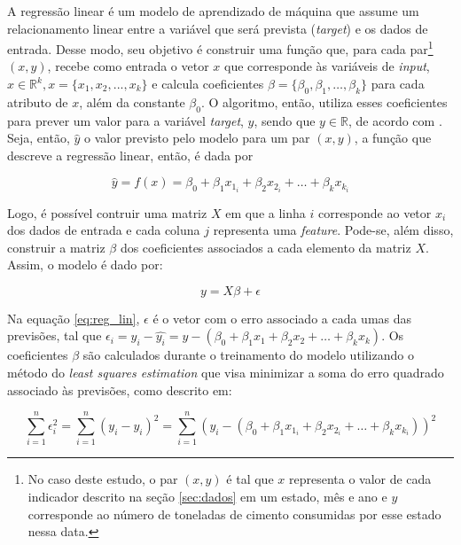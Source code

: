 A regressão linear é um modelo de aprendizado de máquina que assume um relacionamento
linear entre a variável que será prevista (\textit{target}) e os dados de entrada.
Desse modo, seu objetivo é construir uma 
função que, para cada par\footnote{No
caso deste estudo, o par  $(x,y)$ é tal que 
$x$ representa o valor de cada
indicador descrito na seção \ref{sec:dados} em um estado, mês e ano e 
$y$ corresponde ao número de toneladas de cimento consumidas
por esse estado nessa data.} $(x,y)$, recebe como
entrada o vetor $x$ que corresponde às variáveis de \textit{input},
$x \in \mathbb{R}^k , x=\{x_1, x_2, ..., x_k\}$ e calcula coeficientes
$\beta = \{\beta_0, \beta_1, \dots, \beta_k\}$ para cada atributo de $x$,
além da constante $\beta_0$. O algoritmo, então, utiliza esses coeficientes para
prever um valor para a variável \textit{target}, $y$, sendo 
que $y \in \mathbb{R}$, de acordo com \citet{forecasting}. Seja,
então, $\hat{y}$ o valor previsto pelo modelo para um 
par $(x, y)$, a função que descreve a 
regressão linear, então, é dada por

\begin{equation}
  \hat{y} = f(x) = \beta_0 + \beta_1 x_{1_i} + \beta_2 x_{2_i} + \dots + \beta_k x_{k_i} 
\end{equation}

Logo, é possível contruir uma matriz $X$ em que a linha $i$
corresponde ao vetor $x_i$ dos dados de entrada e 
cada coluna $j$ representa uma \textit{feature}. Pode-se, 
além disso, construir a matriz $\beta$ dos coeficientes associados 
a cada elemento da matriz $X$. Assim, o modelo
é dado por:

\begin{equation}
  \label{eq:reg_lin}
  y = X\beta + \epsilon
\end{equation}

Na equação \ref{eq:reg_lin}, $\epsilon$ é o vetor com o erro associado a cada umas 
das previsões, tal que $\epsilon_i = y_i - \hat{y_i} = y - (\beta_0 + \beta_1 x_1 + \beta_2 x_2 + \dots + \beta_k x_k )$.
Os coeficientes $\beta$ são calculados durante o treinamento 
do modelo utilizando o método do \textit{least squares estimation}
que visa minimizar a soma do erro quadrado associado às previsões, 
como descrito em:

\begin{equation}
  \sum_{i=1}^{n} \epsilon_i^2 = \sum_{i=1}^{n} (y_i - \hat{y_i})^2 = 
  \sum_{i=1}^{n} (y_i - (\beta_0 + \beta_1 x_{1_i} + \beta_2 x_{2_i} + \dots + \beta_k x_{k_i} ))^2
\end{equation}

